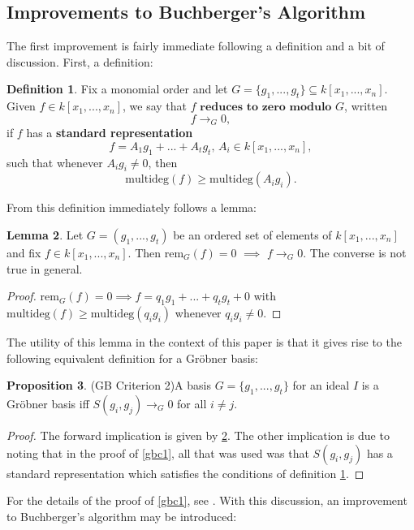 \documentclass[reqno]{amsart}
\theoremstyle{definition}
\newtheorem{lem}{Lemma}
\newtheorem{prop}[lem]{Proposition}
\theoremstyle{definition}
\newtheorem{defn}[lem]{Definition}
\begin{document}
\subsection{Improvements to Buchberger's Algorithm} 
The first improvement is fairly immediate following a definition and a bit of discussion. First, a definition: 

\begin{defn}\label{stdrep}
Fix a monomial order and let $G = \{g_1,...,g_t\} \subseteq k[x_1,...,x_n]$. Given $f\in k[x_1,...,x_n]$, we say that $f$ $\textbf{reduces to zero modulo $G$}$, written $$f\rightarrow_G 0,$$ if $f$ has a \textbf{standard representation} $$f = A_1g_1 + ... + A_tg_t\text{, }A_i\in k[x_1,...,x_n],$$ such that whenever $A_ig_i \neq 0$, then $$\text{multideg}(f)\geq \text{multideg}(A_ig_i).$$
\end{defn}

From this definition immediately follows a lemma: 

 \begin{lem}\label{lem5}
Let $G = (g_1,...,g_t)$ be an ordered set of elements of $k[x_1,...,x_n]$ and fix $f\in k[x_1,...,x_n]$. Then rem$_G(f)=0$ $\implies$ $f\rightarrow_G 0$. The converse is not true in general.
\end{lem}
\begin{proof}
rem$_G(f)=0 \implies f = q_1g_1 + ... + q_tg_t + 0$ with $\text{multideg}(f)\geq \text{multideg}(q_ig_i)$ whenever $q_ig_i \neq 0$.
\end{proof}

The utility of this lemma in the context of this paper is that it gives rise to the following equivalent definition for a Gr{\"o}bner basis: 

\begin{prop}{(GB Criterion 2)}\label{gbc2}
A basis $G = \{g_1, ..., g_t\}$ for an ideal $I$ is a Gr{\"o}bner basis iff $S(g_i,g_j)\rightarrow_G 0$ for all $i\neq j$.
\end{prop}
\begin{proof}
The forward implication is given by \ref{lem5}. The other implication is due to noting that in the proof of \ref{gbc1}, all that was used was that $S(g_i,g_j)$ has a standard representation which satisfies the conditions of definition \ref{stdrep}.
\end{proof}

For the details of the proof of \ref{gbc1}, see \cite{OsheaIVA}. With this discussion, an improvement to Buchberger's algorithm may be introduced: 
\end{document}
